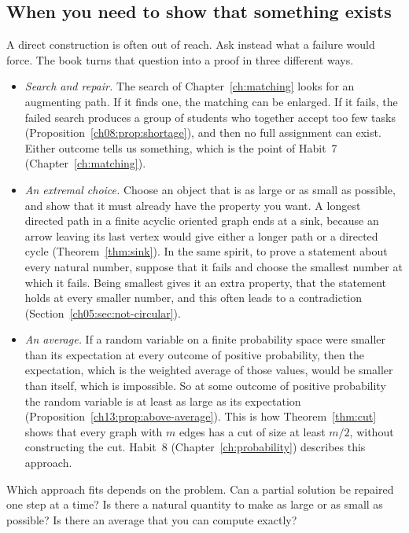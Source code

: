 \subsection*{When you need to show that something exists}
A direct construction is often out of reach. Ask instead what a failure would force. The book turns that question into a proof in three different ways.
\begin{itemize}
\item \emph{Search and repair.} The search of Chapter~\ref{ch:matching} looks for an augmenting path. If it finds one, the matching can be enlarged. If it fails, the failed search produces a group of students who together accept too few tasks (Proposition~\ref{ch08:prop:shortage}), and then no full assignment can exist. Either outcome tells us something, which is the point of Habit~7 (Chapter~\ref{ch:matching}).
\item \emph{An extremal choice.} Choose an object that is as large or as small as possible, and show that it must already have the property you want. A longest directed path in a finite acyclic oriented graph ends at a sink, because an arrow leaving its last vertex would give either a longer path or a directed cycle (Theorem~\ref{thm:sink}). In the same spirit, to prove a statement about every natural number, suppose that it fails and choose the smallest number at which it fails. Being smallest gives it an extra property, that the statement holds at every smaller number, and this often leads to a contradiction (Section~\ref{ch05:sec:not-circular}).
\item \emph{An average.} If a random variable on a finite probability space were smaller than its expectation at every outcome of positive probability, then the expectation, which is the weighted average of those values, would be smaller than itself, which is impossible. So at some outcome of positive probability the random variable is at least as large as its expectation (Proposition~\ref{ch13:prop:above-average}). This is how Theorem~\ref{thm:cut} shows that every graph with $m$ edges has a cut of size at least $m/2$, without constructing the cut. Habit~8 (Chapter~\ref{ch:probability}) describes this approach.
\end{itemize}
Which approach fits depends on the problem. Can a partial solution be repaired one step at a time? Is there a natural quantity to make as large or as small as possible? Is there an average that you can compute exactly?

